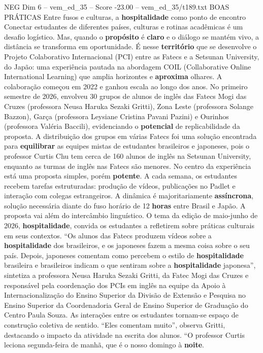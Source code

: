\begin{textsample}{NEG Dim 6 – vem\_ed\_35 – Score -23.00 – vem\_ed\_35/t189.txt}  \label{ex:f6_neg_006}
BOAS PRÁTICAS Entre fusos e culturas, a \textbf{hospitalidade} como ponto de encontro Conectar estudantes de diferentes países, culturas e rotinas acadêmicas é um desafio logístico.
Mas, quando o \textbf{propósito} é \textbf{claro} e o diálogo se mantém vivo, a distância se transforma em oportunidade.
É nesse \textbf{território} que se desenvolve o Projeto Colaborativo Internacional (PCI) entre as Fatecs e a Setsunan University, do Japão: uma experiência pautada na abordagem COIL (Collaborative Online International Learning) que amplia horizontes e \textbf{aproxima} olhares.
A colaboração começou em 2022 e ganhou escala ao longo dos anos.
No primeiro semestre de 2026, envolveu 30 grupos de alunos de inglês das Fatecs Mogi das Cruzes (professora Neusa Haruka Sezaki Gritti), Zona Leste (professora Solange Bazzon), Garça (professora Leysiane Cristina Pavani Pazini) e Ourinhos (professora Valéria Baccili), evidenciando o \textbf{potencial} de replicabilidade da proposta.
A distribuição dos grupos em várias Fatecs foi uma solução encontrada para \textbf{equilibrar} as equipes mistas de estudantes brasileiros e japoneses, pois o professor Curtis Chu tem cerca de 160 alunos de inglês na Setsunan University, enquanto as turmas de inglês nas Fatecs são menores.
No centro da experiência está uma proposta simples, porém \textbf{potente}.
A cada semana, os estudantes recebem tarefas estruturadas: produção de vídeos, publicações no Padlet e interação com colegas estrangeiros.
A dinâmica é majoritariamente \textbf{assíncrona}, solução necessária diante do fuso horário de 12 \textbf{horas} entre Brasil e Japão.
A proposta vai além do intercâmbio linguístico.
O tema da edição de maio-junho de 2026, \textbf{hospitalidade}, convida os estudantes a refletirem sobre práticas culturais em seus contextos. “Os alunos das Fatecs produzem vídeos sobre a \textbf{hospitalidade} dos brasileiros, e os japoneses fazem a mesma coisa sobre o seu país.
Depois, japoneses comentam como percebem o estilo de \textbf{hospitalidade} brasileira e brasileiros indicam o que sentiram sobre a \textbf{hospitalidade} japonesa”, sintetiza a professora Neusa Haruka Sezaki Gritti, da Fatec Mogi das Cruzes e responsável pela coordenação dos PCIs em inglês na equipe da Apoio à Internacionalização do Ensino Superior da Divisão de Extensão e Pesquisa no Ensino Superior da Coordenadoria Geral de Ensino Superior de Graduação do Centro Paula Souza.
As interações entre os estudantes tornam-se espaço de construção coletiva de sentido. “Eles comentam muito”, observa Gritti, destacando o impacto da atividade na escrita dos alunos. “O professor Curtis leciona segunda-feira de manhã, que é o nosso domingo à \textbf{noite}.

\end{textsample}
